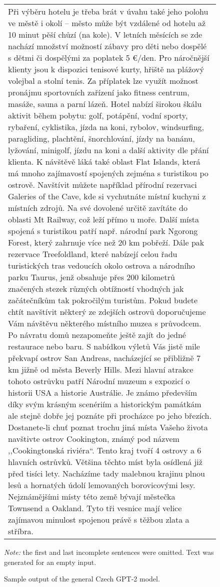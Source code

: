 \begin{figure}[htb]
        \centering
            \begin{tabular}{|l|}
\hline
\parbox{14cm}{\vspace{0.25em}Při výběru hotelu je třeba brát v úvahu také jeho polohu ve městě i okolí – město může být vzdálené od hotelu až 10 minut pěší chůzí (na kole). V letních měsících se zde nachází množství možností zábavy pro děti nebo dospělé s dětmi či dospělými za poplatek 5 €/den. Pro náročnější klienty jsou k dispozici tenisové kurty, hřiště na plážový volejbal a stolní tenis. Za příplatek lze využít možnost pronájmu sportovních zařízení jako fitness centrum, masáže, sauna a parní lázeň. Hotel nabízí širokou škálu aktivit během pobytu: golf, potápění, vodní sporty, rybaření, cyklistika, jízda na koni, rybolov, windsurfing, paragliding, plachtění, šnorchlování, jízdy na banánu, lyžování, minigolf, jízdu na koni a další aktivity dle přání klienta. K návštěvě láká také oblast Flat Islands, která má mnoho zajímavostí spojených zejména s turistikou po ostrově. Navštívit můžete například přírodní rezervaci Galeries of the Cave, kde si vychutnáte místní kuchyni z místních zdrojů. Na své dovolené určitě zavítáte do oblasti Mt Railway, což leží přímo u moře. Další místa spojená s turistikou patří např. národní park Ngorong Forest, který zahrnuje více než 20 km pobřeží. Dále pak rezervace Treefoldland, které nabízejí celou řadu turistických tras vedoucích okolo ostrova a národního parku Taurus, jenž obsahuje přes 200 kilometrů značených stezek různých obtížností vhodných jak začátečníkům tak pokročilým turistům. Pokud budete chtít navštívit některý ze zdejších ostrovů doporučujeme Vám návštěvu některého místního muzea s průvodcem. Po návratu domů nezapomeňte ještě zajít do jedné restaurace nebo baru. S nabídkou výletů Vás jistě mile překvapí ostrov San Andreas, nacházející se přibližně 7 km jižně od města Beverly Hills. Mezi hlavní atrakce tohoto ostrůvku patří Národní muzeum s expozicí o historii USA a historie Austrálie. Je známo především díky svým krásným scenériím a historickým památkám ale stejně dobře jej poznáte při procházce po jeho březích. Dostanete-li chuť poznat trochu jiná místa Vašeho života navštivte ostrov Cookington, známý pod názvem ,,Cookingtonská riviéra``. Tento kraj tvoří 4 ostrovy a 6 hlavních ostrůvků. Většina těchto míst byla osídlená již před tisíci lety. Nacházíme tady malebnou krajinu plnou lesů a hornatých údolí lemovaných borovicovými lesy. Nejznámějšími místy této země bývají městečka Townsend a Oakland. Tyto tři vesnice mají velice zajímavou minulost spojenou právě s těžbou zlata a stříbra.\vspace{0.25em}}
\\ \hline
             \end{tabular}
        \caption{Sample output of the general Czech GPT-2 model.}
	\label{fig01:gpt2GenExample}
\textit{Note:} the first and last incomplete sentences were omitted. Text was generated for an empty input.
\end{figure}

